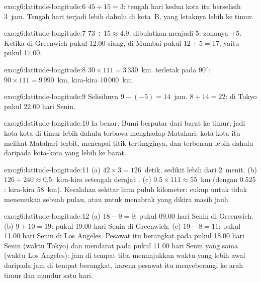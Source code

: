 \begin{solution}{exo:g6:latitude-longitude:6}
$45 \div 15 = 3$: tengah hari kedua kota itu berselisih 3~jam. Tengah hari
terjadi lebih dahulu di kota~B, yang letaknya lebih ke timur.
\end{solution}

\begin{solution}{exo:g6:latitude-longitude:7}
$73 \div 15 \approx 4.9$, dibulatkan menjadi 5: zonanya $+5$. Ketika di
Greenwich pukul 12.00 siang, di Mumbai pukul $12 + 5 = 17$, yaitu pukul
17.00.
\end{solution}

\begin{solution}{exo:g6:latitude-longitude:8}
$30 \times 111 = 3\,330$~km.  terletak pada $90^\circ$:
$90 \times 111 = 9\,990$~km, kira-kira 10\,000~km.
\end{solution}

\begin{solution}{exo:g6:latitude-longitude:9}
Selisihnya $9 - (-5) = 14$~jam. $8 + 14 = 22$: di Tokyo pukul 22.00 hari
Senin.
\end{solution}

\begin{solution}{exo:g6:latitude-longitude:10}
Ia benar. Bumi berputar dari barat ke timur, jadi kota-kota di timur lebih
dahulu terbawa menghadap Matahari: kota-kota itu melihat Matahari terbit,
mencapai titik tertingginya, dan terbenam lebih dahulu daripada kota-kota
yang lebih ke barat.
\end{solution}

\begin{solution}{exo:g6:latitude-longitude:11}
(a) $42 \times 3 = 126$~detik, sedikit lebih dari 2~menit. (b)
$126 \div 240 \approx 0.5$: kira-kira setengah derajat . (c)
$0.5 \times 111 \approx 55$~km (dengan $0.525$: kira-kira 58~km). Kesalahan
sekitar lima puluh kilometer: cukup untuk tidak menemukan sebuah pulau,
atau untuk menabrak  yang dikira masih jauh.
\end{solution}

\begin{solution}{exo:g6:latitude-longitude:12}
(a) $18 - 9 = 9$: pukul 09.00 hari Senin di Greenwich. (b) $9 + 10 = 19$:
pukul 19.00 hari Senin di Greenwich. (c) $19 - 8 = 11$: pukul 11.00 hari
Senin di Los Angeles. Pesawat itu berangkat pada pukul 18.00 hari Senin
(waktu Tokyo) dan mendarat pada pukul 11.00 hari Senin yang sama (waktu Los
Angeles): jam di tempat tiba menunjukkan waktu yang lebih awal daripada jam
di tempat berangkat, karena pesawat itu menyeberangi  ke
arah timur dan mundur satu hari.
\end{solution}

